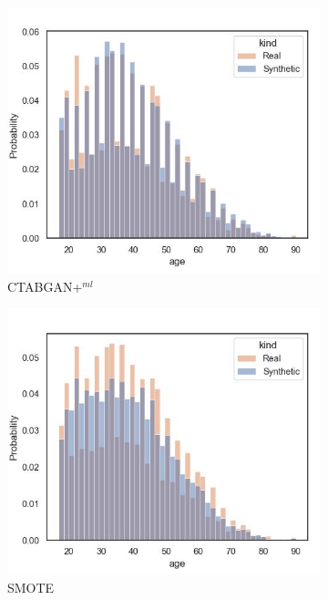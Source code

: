 \begin{figure}[h]
	\begin{subfigure}{0.23\textwidth}
		\centering
		\includegraphics[width=\textwidth]{images/dist_age/ctabgan+.jpg}
		\caption{CTABGAN+$^{ml}$}
	\end{subfigure}
	\begin{subfigure}{0.23\textwidth}
		\centering
		\includegraphics[width=\textwidth]{images/dist_age/SMOTE.jpg}
		\caption{SMOTE}
	\end{subfigure}
	\begin{subfigure}{0.23\textwidth}

\end{subfigure}
\end{figure}
